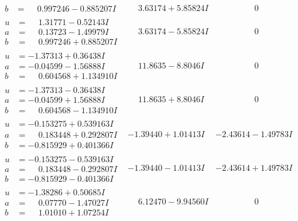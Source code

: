 \documentclass[1p]{elsarticle_modified}
\theoremstyle{definition}
\begin{document}
$$\begin{array}{c|c|c}
\begin{aligned}
b &= \phantom{-}0.997246 - 0.885207 I\end{aligned}
 & \phantom{-}3.63174 + 5.85824 I & \phantom{-0.000000 } 0 \\ \hline\begin{aligned}
u &= \phantom{-}1.31771 - 0.52143 I \\
a &= \phantom{-}0.13723 - 1.49979 I \\
b &= \phantom{-}0.997246 + 0.885207 I\end{aligned}
 & \phantom{-}3.63174 - 5.85824 I & \phantom{-0.000000 } 0 \\ \hline\begin{aligned}
u &= -1.37313 + 0.36438 I \\
a &= -0.04599 - 1.56888 I \\
b &= \phantom{-}0.604568 + 1.134910 I\end{aligned}
 & \phantom{-}11.8635 - 8.8046 I & \phantom{-0.000000 } 0 \\ \hline\begin{aligned}
u &= -1.37313 - 0.36438 I \\
a &= -0.04599 + 1.56888 I \\
b &= \phantom{-}0.604568 - 1.134910 I\end{aligned}
 & \phantom{-}11.8635 + 8.8046 I & \phantom{-0.000000 } 0 \\ \hline\begin{aligned}
u &= -0.153275 + 0.539163 I \\
a &= \phantom{-}0.183448 + 0.292807 I \\
b &= -0.815929 + 0.401366 I\end{aligned}
 & -1.39440 + 1.01413 I & -2.43614 - 1.49783 I \\ \hline\begin{aligned}
u &= -0.153275 - 0.539163 I \\
a &= \phantom{-}0.183448 - 0.292807 I \\
b &= -0.815929 - 0.401366 I\end{aligned}
 & -1.39440 - 1.01413 I & -2.43614 + 1.49783 I \\ \hline\begin{aligned}
u &= -1.38286 + 0.50685 I \\
a &= \phantom{-}0.07770 - 1.47027 I \\
b &= \phantom{-}1.01010 + 1.07254 I\end{aligned}
 & \phantom{-}6.12470 - 9.94560 I & \phantom{-0.000000 } 0 \\ \hline\begin{aligned}

\end{aligned}
\end{array}$$
\end{document}
